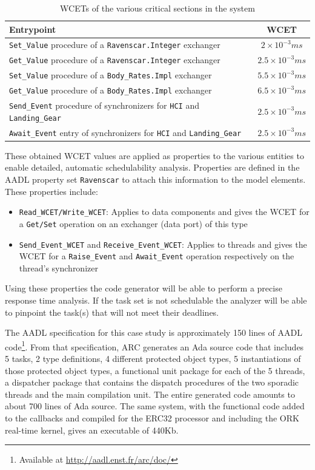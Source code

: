 \begin{table}
\centering
\begin{tabular}{|l|c|}
\hline
\textbf{Entrypoint} & \textbf{WCET}\\
\hline
\texttt{Set\_Value} procedure of a \texttt{Ravenscar.Integer}
exchanger & $2\times 10^{-3} ms$\\
\texttt{Get\_Value} procedure of a \texttt{Ravenscar.Integer}
exchanger & $2.5\times 10^{-3} ms$\\
\texttt{Set\_Value} procedure of a \texttt{Body\_Rates.Impl} exchanger
& $5.5\times 10^{-3} ms$\\
\texttt{Get\_Value} procedure of a \texttt{Body\_Rates.Impl} exchanger
& $6.5\times 10^{-3} ms$\\
\texttt{Send\_Event} procedure of synchronizers for \texttt{HCI} and
\texttt{Landing\_Gear} & $2.5\times 10^{-3} ms$\\
\texttt{Await\_Event} entry of synchronizers for \texttt{HCI} and
\texttt{Landing\_Gear} & $2.5\times 10^{-3} ms$\\
\hline
\end{tabular}
\caption{WCETs of the various critical sections in the system}
\label{tab:wcets}
\end{table}

These obtained WCET values are applied as properties to the various
\aadl entities to enable detailed, automatic schedulability
analysis. Properties are defined in the AADL property set
\texttt{Ravenscar} to attach this information to the model elements.
These properties include:

\begin{itemize}
\item{\texttt{Read\_WCET/Write\_WCET}: Applies to data components and
  gives the WCET for a \texttt{Get/Set} operation on an exchanger
  (data port) of this type}
\item{\texttt{Send\_Event\_WCET} and \texttt{Receive\_Event\_WCET}:
  Applies to threads and gives the WCET for a \texttt{Raise\_Event}
  and \texttt{Await\_Event} operation respectively on the thread's
  synchronizer}
\end{itemize}

Using these properties the code generator will be able to perform a
precise response time analysis. If the task set is not schedulable the
analyzer will be able to pinpoint the task(s) that will not meet their
deadlines.

The AADL specification for this case study is approximately 150 lines
of AADL code\footnote{Available at
  \url{http://aadl.enst.fr/arc/doc/}}. From that specification, ARC
generates an Ada source code that includes 5 tasks, 2 type
definitions, 4 different protected object types, 5 instantiations of
those protected object types, a functional unit package for each of
the 5 threads, a dispatcher package that contains the dispatch
procedures of the two sporadic threads and the main compilation
unit. The entire generated code amounts to about 700 lines of Ada
source. The same system, with the functional code added to the
callbacks and compiled for the ERC32 processor and including the ORK
real-time kernel, gives an executable of 440Kb.

